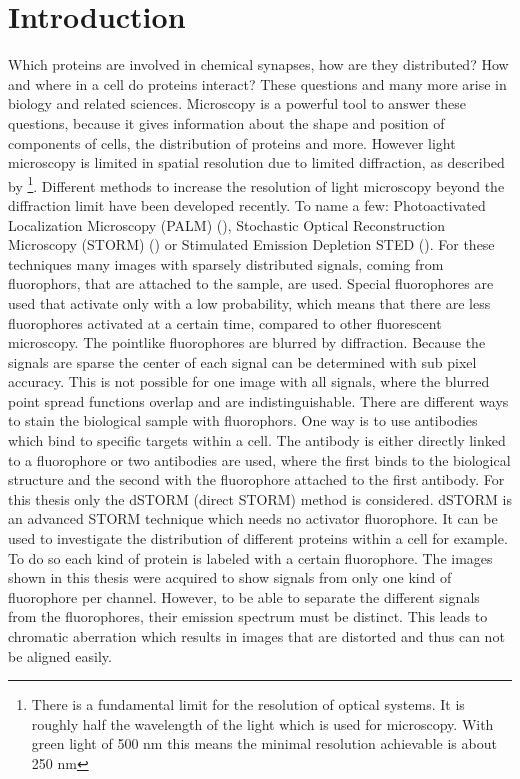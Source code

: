 \chapter{Introduction}
Which proteins are involved in chemical synapses, how are they distributed? How and where in a cell do proteins interact? These questions and many more arise in biology and related sciences. Microscopy is a powerful tool to answer these questions, because it gives information about the shape and position of components of cells, the distribution of proteins and more. However light microscopy is limited in spatial resolution due to limited diffraction, as described by \cite{Abbe} \footnote{There is a fundamental limit for the resolution of optical systems. It is roughly half the wavelength of the light which is used for microscopy. With green light of 500 nm this means the minimal resolution achievable is about 250 nm}. Different methods to increase the resolution of light microscopy beyond the diffraction limit have been developed recently. To name a few: Photoactivated Localization Microscopy (PALM) (\cite{Palm}), Stochastic Optical Reconstruction Microscopy (STORM) (\cite{Storm}) or Stimulated Emission Depletion STED (\cite{sted}).\newline
For these techniques many images with sparsely distributed signals, coming from fluorophors, that are attached to the sample, are used. Special fluorophores are used that activate only with a low probability, which means that there are less fluorophores activated at a certain time, compared to other fluorescent microscopy. The pointlike fluorophores are blurred by diffraction. Because the signals are sparse the center of each signal can be determined with sub pixel accuracy. This is not possible for one image with all signals, where the blurred point spread functions overlap and are indistinguishable. There are different ways to stain the biological sample with fluorophors. One way is to use antibodies which bind to specific targets within a cell. The antibody is either directly linked to a fluorophore or two antibodies are used, where the first binds to the biological structure and the second with the fluorophore attached to the first antibody. 
\newline
For this thesis only the dSTORM (direct STORM) method is considered. dSTORM is an advanced STORM technique which needs no activator fluorophore. It can be used to investigate the distribution of different proteins within a cell for example. To do so each kind of protein is labeled with a certain fluorophore. The images shown in this thesis were acquired to show signals from only one kind of fluorophore per channel. However, to be able to separate the different signals from the fluorophores, their emission spectrum must be distinct. This leads to chromatic aberration which results in images that are distorted and thus can not be aligned easily.\newline 
